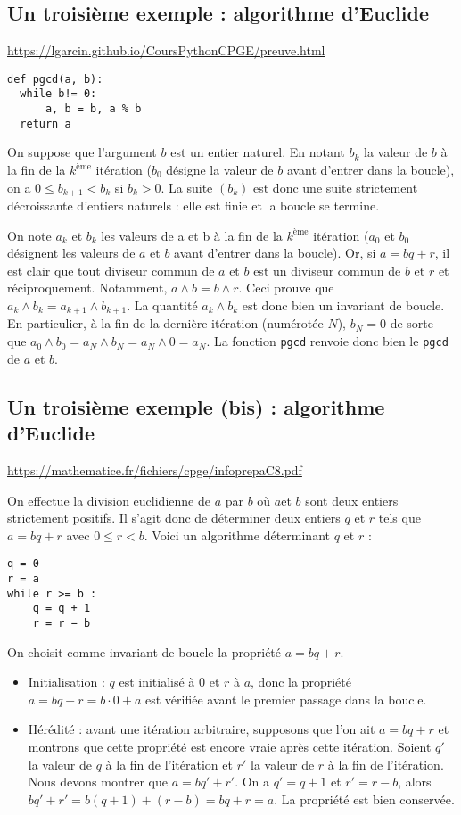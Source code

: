 \subsection{Un troisième exemple : algorithme d'Euclide}
\url{https://lgarcin.github.io/CoursPythonCPGE/preuve.html}

\begin{lstlisting}
def pgcd(a, b):
  while b!= 0:
      a, b = b, a % b
  return a
\end{lstlisting}

On suppose que l'argument $b$ est un entier naturel. En notant $b_k$ la valeur de $b$ à la fin de la $k^\text{ème}$ itération ($b_0$ désigne la valeur de $b$ avant d'entrer dans la boucle), on a $0\leq b_{k+1}<b_k$ si $b_k>0$. La suite $(b_k)$ est donc une suite strictement décroissante d'entiers naturels : elle est finie et la boucle se termine.


On note $a_k$ et $b_k$ les valeurs de a et b à la fin de la $k^\text{ème}$ itération ($a_0$ et $b_0$ désignent les valeurs de $a$ et $b$ avant d'entrer dans la boucle). Or, si $a=bq+r$, il est clair que tout diviseur commun de $a$ et $b$ est un diviseur commun de $b$ et $r$ et réciproquement. Notamment, $a\wedge b=b\wedge r$. Ceci prouve que $a_k\wedge b_k=a_{k+1}\wedge b_{k+1}$. La quantité $a_k\wedge b_k$ est donc bien un invariant de boucle. En particulier, à la fin de la dernière itération (numérotée $N$), $b_N=0$ de sorte que $a_0\wedge b_0=a_N\wedge b_N=a_N\wedge0=a_N$. La fonction \texttt{pgcd} renvoie donc bien le \texttt{pgcd} de $a$ et $b$.

\subsection{Un troisième exemple (bis) : algorithme d'Euclide}
\url{https://mathematice.fr/fichiers/cpge/infoprepaC8.pdf}

On effectue la division euclidienne de $a$ par $b$ où $a $et $b$ sont deux entiers strictement positifs. Il s’agit
donc de déterminer deux entiers $q$ et $r$ tels que $a = bq+r$ avec $0 \leq r < b$. Voici un algorithme déterminant
$q$ et $r$ :

\begin{lstlisting}
q = 0
r = a
while r >= b :
    q = q + 1
    r = r − b
\end{lstlisting}

On choisit comme invariant de boucle la propriété $a = bq + r$.
\begin{itemize}
\item Initialisation : $q$ est initialisé à 0 et $r$ à $a$, donc la propriété $a = bq + r = b\cdot 0 + a$ est vérifiée avant le premier passage dans la boucle.
\item Hérédité : avant une itération arbitraire, supposons que l’on ait $a = bq + r$ et montrons que cette propriété est encore vraie après cette itération. Soient $q'$ la valeur de $q$ à la fin de l’itération et $r'$ la valeur de $r$ à la fin de l’itération. Nous devons montrer que $a = bq' + r'$. On a $q'= q + 1$ et $r' = r- b$, alors $bq' + r' = b(q + 1) + (r - b) = bq + r = a$. La propriété est bien conservée.
\end{itemize}


